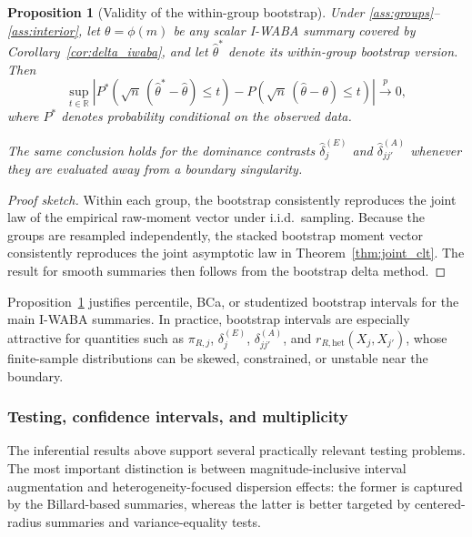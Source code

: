 \documentclass[preprint, times, 12pt, authoryear]{elsarticle}
\newtheorem{proposition}[theorem]{Proposition}
\begin{document}
\begin{proposition}[Validity of the within-group bootstrap]\label{prop:bootstrap_validity}
	Under \ref{ass:groups}--\ref{ass:interior}, let $\theta=\phi(m)$ be any scalar I-WABA summary covered by Corollary~\ref{cor:delta_iwaba}, and let $\hat\theta^*$ denote its within-group bootstrap version. Then
	\[
	\sup_{t\in\mathbb R}
	\left|
	P^*\!\left(\sqrt{n}\,(\hat\theta^*-\hat\theta)\le t\right)
	-
	P\!\left(\sqrt{n}\,(\hat\theta-\theta)\le t\right)
	\right|
	\xrightarrow{p}0,
	\]
	where $P^*$ denotes probability conditional on the observed data.
	
	The same conclusion holds for the dominance contrasts $\hat\delta_j^{(E)}$ and $\hat\delta_{jj'}^{(A)}$ whenever they are evaluated away from a boundary singularity.
\end{proposition}

\begin{proof}[Proof sketch]
	Within each group, the bootstrap consistently reproduces the joint law of the empirical raw-moment vector under i.i.d.\ sampling. Because the groups are resampled independently, the stacked bootstrap moment vector consistently reproduces the joint asymptotic law in Theorem~\ref{thm:joint_clt}. The result for smooth summaries then follows from the bootstrap delta method.
\end{proof}

Proposition~\ref{prop:bootstrap_validity} justifies percentile, BCa, or studentized bootstrap intervals for the main I-WABA summaries. In practice, bootstrap intervals are especially attractive for quantities such as $\pi_{R,j}$, $\delta_j^{(E)}$, $\delta_{jj'}^{(A)}$, and $r_{R,\mathrm{het}}(X_j,X_{j'})$, whose finite-sample distributions can be skewed, constrained, or unstable near the boundary.

\subsubsection{Testing, confidence intervals, and multiplicity}

The inferential results above support several practically relevant testing problems. The most important distinction is between magnitude-inclusive interval augmentation and heterogeneity-focused dispersion effects: the former is captured by the Billard-based summaries, whereas the latter is better targeted by centered-radius summaries and variance-equality tests.
\end{document}
